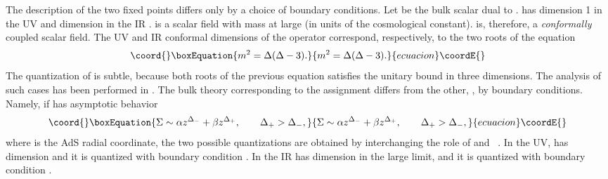 \documentclass[a4paper,12pt]{article}
\begin{document}
The description of the two fixed points differs only by a choice of
boundary conditions.  Let \myHighlight{$\Sigma$}\coordHE{} be the bulk scalar dual to
\coordHE{}.  \coordHE{} has dimension 1 in the UV and
dimension \coordHE{} in the IR \cite{wilson}.  \myHighlight{$\Sigma$}\coordHE{} is a scalar
field with mass \coordHE{} at large \coordHE{} (in units of the cosmological
constant). \myHighlight{$\Sigma$}\coordHE{} is, therefore, a {\it conformally} coupled scalar
field. The UV and IR conformal dimensions of the operator correspond,
respectively, to the two roots of the equation
\begin{equation}\coord{}\boxEquation{
m^2=\Delta (\Delta-3).
}{
m^2=\Delta (\Delta-3).
}{ecuacion}\coordE{}\end{equation}
The quantization of \myHighlight{$\Sigma$}\coordHE{} is subtle, because both roots
\myHighlight{$\Delta_{\pm}$}\coordHE{} of the previous equation satisfies the unitary bound
in three dimensions.  The analysis of such cases has been performed
in \cite{kw}. The bulk theory corresponding to the assignment
\myHighlight{$\Delta=\Delta_+$}\coordHE{} differs from the other, \myHighlight{$\Delta=\Delta_-$}\coordHE{}, by 
boundary conditions. Namely, if \myHighlight{$\Sigma$}\coordHE{} has asymptotic
behavior
\begin{equation}\coord{}\boxEquation{
\Sigma\sim \alpha z^{\Delta_-} + \beta z^{\Delta_+}, \qquad 
\Delta_+>\Delta_-,
}{
\Sigma\sim \alpha z^{\Delta_-} + \beta z^{\Delta_+}, \qquad 
\Delta_+>\Delta_-,
}{ecuacion}\coordE{}\end{equation}
where \coordHE{} is the AdS radial coordinate, the two possible quantizations are
obtained by interchanging the role of \myHighlight{$\alpha$}\coordHE{} and \myHighlight{$\beta$}\coordHE{}~\cite{kw}.
In the UV, \coordHE{} has dimension \coordHE{} and it is quantized
with boundary condition \coordHE{}. In the IR \coordHE{} has
dimension \coordHE{} in the large \coordHE{} limit, and it is quantized with
boundary condition \coordHE{}.
\end{document}
